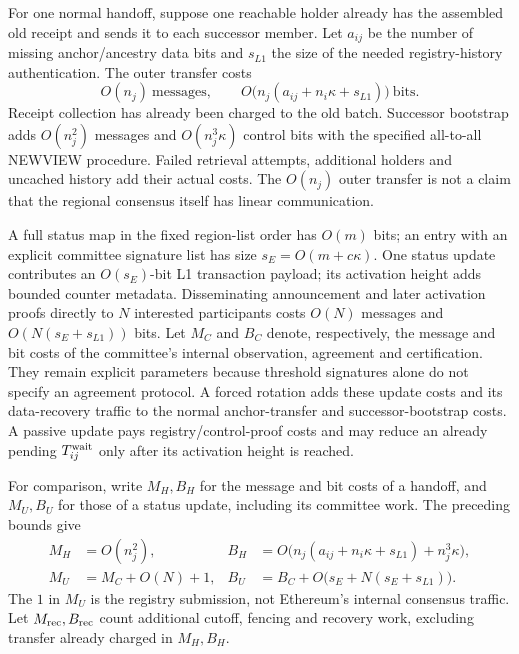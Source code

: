 \documentclass[11pt,a4paper,onecolumn]{article}
\newcounter{protocol}
\begin{document}
For one normal handoff, suppose one reachable holder already has the
assembled old receipt and sends it to each successor member. Let $a_{ij}$
be the number of missing anchor/ancestry data bits and $s_{L1}$ the size of
the needed registry-history authentication. The outer transfer costs
\[
 O(n_j)\ \text{messages},\qquad
 O\bigl(n_j(a_{ij}+n_i\kappa+s_{L1})\bigr)\ \text{bits}.
\]
Receipt collection has already been charged to the old batch. Successor
bootstrap adds $O(n_j^2)$ messages and $O(n_j^3\kappa)$ control bits with
the specified all-to-all NEWVIEW procedure. Failed retrieval attempts,
additional holders and uncached history add their actual costs. The
$O(n_j)$ outer transfer is not a claim that the regional consensus itself
has linear communication.

A full status map in the fixed region-list order has $O(m)$ bits; an
entry with an explicit committee signature list has size
$s_E=O(m+c\kappa)$. One status update contributes an $O(s_E)$-bit L1
transaction payload; its activation height adds bounded counter metadata.
Disseminating announcement and later activation proofs directly to $N$
interested participants costs $O(N)$ messages and $O(N(s_E+s_{L1}))$ bits. Let $M_C$ and
$B_C$ denote, respectively, the message and bit costs of the committee's
internal observation, agreement and certification. They remain explicit
parameters because threshold
signatures alone do not specify an agreement protocol. A forced
rotation adds these update costs and its data-recovery traffic to the
normal anchor-transfer and successor-bootstrap costs. A passive update
pays registry/control-proof costs and may reduce an already pending
$T_{ij}^{\rm wait}$ only after its activation height is reached.

For comparison, write $M_H,B_H$ for the message and bit costs of a handoff,
and $M_U,B_U$ for those of a status update, including its committee work.
The preceding bounds give
\[
 \begin{aligned}
 M_H&=O(n_j^2),&
 B_H&=O\bigl(n_j(a_{ij}+n_i\kappa+s_{L1})+n_j^3\kappa\bigr),\\
 M_U&=M_C+O(N)+1,&
 B_U&=B_C+O\bigl(s_E+N(s_E+s_{L1})\bigr).
 \end{aligned}
\]
The $1$ in $M_U$ is the registry submission, not Ethereum's internal
consensus traffic. Let $M_{\rm rec},B_{\rm rec}$ count additional cutoff,
fencing and recovery work, excluding transfer already charged in $M_H,B_H$.
\end{document}
